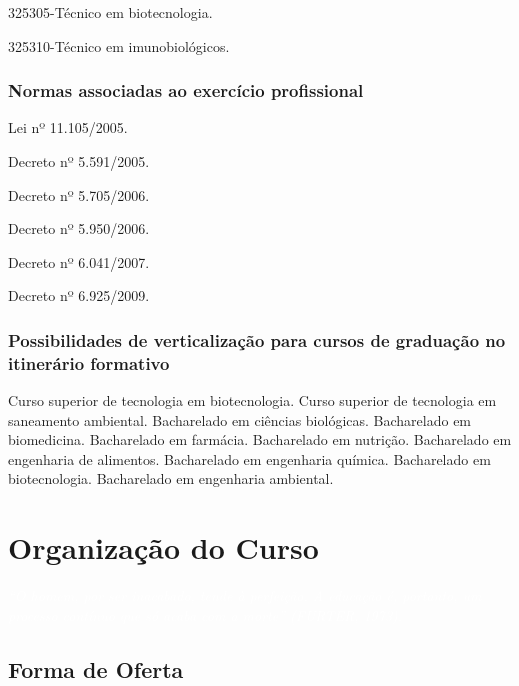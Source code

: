 \documentclass[11pt,fleqn]{book} %
\begin{document}
325305-Técnico em biotecnologia. 

325310-Técnico em imunobiológicos.

\subsection{Normas associadas ao exercício profissional}
\indent

Lei nº 11.105/2005. 

Decreto nº 5.591/2005. 

Decreto nº 5.705/2006. 

Decreto nº 5.950/2006. 

Decreto nº 6.041/2007.

Decreto nº 6.925/2009. 

\subsection{Possibilidades de verticalização para cursos de graduação no itinerário formativo}

Curso superior de tecnologia em biotecnologia. 
Curso superior de tecnologia em saneamento ambiental. 
Bacharelado em ciências biológicas. 
Bacharelado em biomedicina. 
Bacharelado em farmácia. 
Bacharelado em nutrição. 
Bacharelado em engenharia de alimentos. 
Bacharelado em engenharia química. 
Bacharelado em biotecnologia. 
Bacharelado em engenharia ambiental.


\chapter{Organização do Curso}
\vspace{6em}
\begin{flushright}
	\textit{\textcolor{white}{``O homem, por ser inacabado, tende à perfeição. A educação é, portanto, um
			processo contínuo que só acaba com a morte'' (FURTER, 1973).}}
\end{flushright}
\vspace{12em}

\section{Forma de Oferta}\label{carga}
\indent
\end{document}
